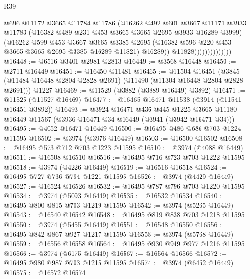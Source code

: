 \begin{lexlean}{R39}
\begin{coremodule}
                                @696
                                @11172
                                @3665
                                @11784
                                @11786
                                (@16262
                                  @492
                                  @601
                                  @3667
                                  @11171
                                  @3933
                                  @11783
                                  (@16382 @489 @231 @453 @3665 @3665 @2695 @3933 @16289 @3999)
                                  (@16262
                                    @599
                                    @453
                                    @3667
                                    @3665
                                    @3385
                                    @2695
                                    (@16382 @596 @220 @453 @3665 @3665 @2695 @3385 @16289 @11821)
                                    @16289))
                                @11828))))))))))))))
@16448 := @6516 @3401 @2981 @2813
@16449 := @3568 @16448
@16450 := @2711 @16449
@16451 := @16450 @11481
@16465 := @11504
    @16451
    (@3845 (@11484 @16448 @2804 @2828 @2691) (@11490 (@11304 @16448 @2804 @2828 @2691)))
    @1227
@16469 := @11529 (@3882 (@3889 @16449) @3892)
@16471 := @11525 (@11527 @16469)
@16477 := @16465 @16471 @11538 (@3914 (@11541 @16451 @3892))
@16493 := @3924
    @16471
    @436
    @445
    @1225
    @3665
    @11180
    @16449
    @11567
    (@3936 @16471 @34 @16449 (@3941 (@3942 @16471 @34)))
@16495 := @4052 @16471 @16449
@16500 := @16495 @486 @686 @703 @1224 @11595
@16502 := @3974 (@3976 @16449)
@16503 := @16500 @16502
@16508 := @16495 @573 @712 @703 @1223 @11595
@16510 := @3974 (@4088 @16449)
@16511 := @16508 @16510
@16516 := @16495 @716 @723 @703 @1222 @11595
@16518 := @3974 (@4226 @16449)
@16519 := @16516 @16518
@16524 := @16495 @727 @736 @784 @1221 @11595
@16526 := @3974 (@4429 @16449)
@16527 := @16524 @16526
@16532 := @16495 @787 @796 @703 @1220 @11595
@16534 := @3974 (@5093 @16449)
@16535 := @16532 @16534
@16540 := @16495 @800 @815 @703 @1219 @11595
@16542 := @3974 (@5265 @16449)
@16543 := @16540 @16542
@16548 := @16495 @819 @838 @703 @1218 @11595
@16550 := @3974 (@5455 @16449)
@16551 := @16548 @16550
@16556 := @16495 @842 @867 @927 @1217 @11595
@16558 := @3974 (@5768 @16449)
@16559 := @16556 @16558
@16564 := @16495 @930 @949 @977 @1216 @11595
@16566 := @3974 (@6175 @16449)
@16567 := @16564 @16566
@16572 := @16495 @980 @987 @703 @1215 @11595
@16574 := @3974 (@6452 @16449)
@16575 := @16572 @16574

\end{coremodule}
\end{lexlean}
